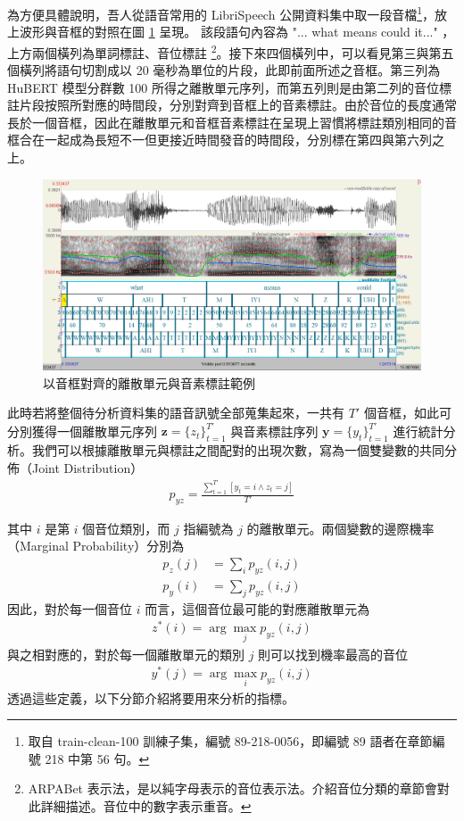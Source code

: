 {{        為方便具體說明，吾人從語音常用的 LibriSpeech \cite{panayotov_librispeech_2015} 公開資料集中取一段音檔\footnote{取自 train-clean-100 訓練子集，編號 89-218-0056，即編號 89 語者在章節編號 218 中第 56 句。}，放上波形與音框的對照在圖 \ref{fig:enter-labelwav} 呈現。 該段語句內容為 "... what means could it..." ，上方兩個橫列為單詞標註、音位標註 \footnote{ARPABet 表示法，是以純字母表示的音位表示法。介紹音位分類的章節會對此詳細描述。音位中的數字表示重音。}。接下來四個橫列中，可以看見第三與第五個橫列將語句切割成以 20 毫秒為單位的片段，此即前面所述之音框。第三列為 HuBERT 模型分群數 100 所得之離散單元序列，而第五列則是由第二列的音位標註片段按照所對應的時間段，分別對齊到音框上的音素標註。由於音位的長度通常長於一個音框，因此在離散單元和音框音素標註在呈現上習慣將標註類別相同的音框合在一起成為長短不一但更接近時間發音的時間段，分別標在第四與第六列之上。
        \begin{figure}
            \centering
            \includegraphics[width=1\linewidth]{figures/praat.png}
            \caption{以音框對齊的離散單元與音素標註範例}
            \label{fig:enter-labelwav}
        \end{figure}
        
        此時若將整個待分析資料集的語音訊號全部蒐集起來，一共有 $T'$ 個音框，如此可分別獲得一個離散單元序列 $\boldsymbol{z} = \{z_t\}_{t=1}^{T'}$ 與音素標註序列 $\boldsymbol{y} = \{y_t\}_{t=1}^{T'}$ 進行統計分析。我們可以根據離散單元與標註之間配對的出現次數，寫為一個雙變數的共同分佈（Joint Distribution）
\begin{align}
    p_{yz} = \frac{\sum^{T'}_{t=1}[{y_t = i \wedge z_t = j}]}{T'}
\end{align}

其中 $i$ 是第 $i$ 個音位類別，而 $j$ 指編號為 $j$ 的離散單元。兩個變數的邊際機率（Marginal Probability）分別為
\begin{align}
    p_z(j) & =\sum_i{p_{yz}(i, j)} \\
    p_y(i) & =\sum_j{p_{yz}(i, j)}
\end{align}
因此，對於每一個音位 $i$ 而言，這個音位最可能的對應離散單元為
\begin{align}
    z^\ast(i) = \arg\max_j p_{yz}(i, j)
\end{align}
與之相對應的，對於每一個離散單元的類別 $j$ 則可以找到機率最高的音位
\begin{align}
    y^\ast(j) = \arg\max_i p_{yz}(i,j)
\end{align}
透過這些定義，以下分節介紹將要用來分析的指標。

}}
